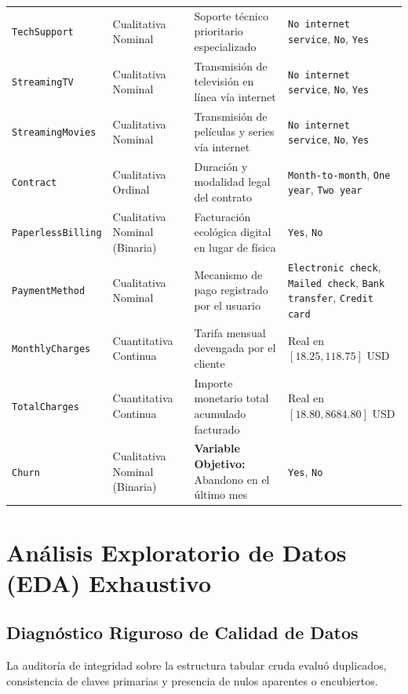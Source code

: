 \documentclass[11pt,letterpaper]{article}
\begin{document}
\begin{table}[H]
\begin{tabularx}{\linewidth}{p{2.8cm}p{3.2cm}Xp{2.6cm}}
        \texttt{TechSupport} & Cualitativa Nominal & Soporte técnico prioritario especializado & \texttt{No internet service}, \texttt{No}, \texttt{Yes} \\
        \texttt{StreamingTV} & Cualitativa Nominal & Transmisión de televisión en línea vía internet & \texttt{No internet service}, \texttt{No}, \texttt{Yes} \\
        \texttt{StreamingMovies}& Cualitativa Nominal & Transmisión de películas y series vía internet & \texttt{No internet service}, \texttt{No}, \texttt{Yes} \\
        \texttt{Contract} & Cualitativa Ordinal & Duración y modalidad legal del contrato & \texttt{Month-to-month}, \texttt{One year}, \texttt{Two year} \\
        \texttt{PaperlessBilling}& Cualitativa Nominal (Binaria) & Facturación ecológica digital en lugar de física & \texttt{Yes}, \texttt{No} \\
        \texttt{PaymentMethod} & Cualitativa Nominal & Mecanismo de pago registrado por el usuario & \texttt{Electronic check}, \texttt{Mailed check}, \texttt{Bank transfer}, \texttt{Credit card} \\
        \texttt{MonthlyCharges} & Cuantitativa Continua & Tarifa mensual devengada por el cliente & Real en $[18.25, 118.75]$ USD \\
        \texttt{TotalCharges} & Cuantitativa Continua & Importe monetario total acumulado facturado & Real en $[18.80, 8684.80]$ USD \\
        \texttt{Churn} & Cualitativa Nominal (Binaria) & \textbf{Variable Objetivo:} Abandono en el último mes & \texttt{Yes}, \texttt{No} \\
        \bottomrule
    \end{tabularx}
\end{table}

\section{Análisis Exploratorio de Datos (EDA) Exhaustivo}

\subsection{Diagnóstico Riguroso de Calidad de Datos}
La auditoría de integridad sobre la estructura tabular cruda evaluó duplicados, consistencia de claves primarias y presencia de nulos aparentes o encubiertos.
\end{document}
